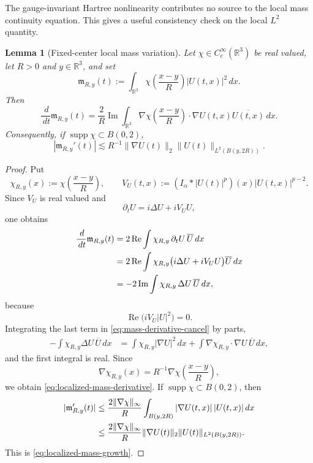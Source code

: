 \documentclass[preprint,12pt]{elsarticle}
\numberwithin{equation}{section}
\newtheorem{lemma}[theorem]{Lemma}
\theoremstyle{remark}
\newcommand{\R}{\mathbb R}
\newcommand{\dd}{\,d}
\begin{document}
The gauge-invariant Hartree nonlinearity contributes no source to the local mass continuity equation. This gives a useful consistency check on the local $L^2$ quantity.

\begin{lemma}[Fixed-center local mass variation]\label{lem:local-mass-variation}
Let $\chi\in C_c^\infty(\R^3)$ be real valued, let $R>0$ and $y\in\R^3$, and set
\begin{equation*}
  \mathfrak m_{R,y}(t)
  :=\int_{\R^3}\chi\left(\frac{x-y}{R}\right)|U(t,x)|^2\dd x.
\end{equation*}
Then
\begin{equation}\label{eq:localized-mass-derivative}
  \frac{\dd}{\dd t}\mathfrak m_{R,y}(t)
  =\frac2R\operatorname{Im}
  \int_{\R^3}
  \nabla\chi\left(\frac{x-y}{R}\right)
  \cdot\nabla U(t,x)\overline{U(t,x)}\dd x.
\end{equation}
Consequently, if $\operatorname{supp}\chi\subset B(0,2)$,
\begin{equation}\label{eq:localized-mass-growth}
  |\mathfrak m_{R,y}'(t)|
  \lesssim R^{-1}\|\nabla U(t)\|_2
  \|U(t)\|_{L^2(B(y,2R))}.
\end{equation}
\end{lemma}

\begin{proof}
Put
\[
  \chi_{R,y}(x):=\chi\left(\frac{x-y}{R}\right),
  \qquad
  V_U(t,x):=(I_\alpha*|U(t)|^p)(x)|U(t,x)|^{p-2}.
\]
Since $V_U$ is real valued and
\[
  \partial_tU=i\Delta U+iV_UU,
\]
one obtains
\begin{align}
  \frac{\dd}{\dd t}\mathfrak m_{R,y}(t)
  &=2\operatorname{Re}
  \int\chi_{R,y}\,\partial_tU\,\overline U\dd x\notag\\
  &=2\operatorname{Re}
  \int\chi_{R,y}
  \bigl(i\Delta U+iV_UU\bigr)\overline U\dd x\notag\\
  &=-2\operatorname{Im}
  \int\chi_{R,y}\,\Delta U\,\overline U\dd x,
  \label{eq:mass-derivative-cancel}
\end{align}
because
\[
  \operatorname{Re}\bigl(iV_U|U|^2\bigr)=0.
\]
Integrating the last term in \eqref{eq:mass-derivative-cancel} by parts,
\begin{align*}
  -\int\chi_{R,y}\Delta U\,\overline U\dd x
  &=\int\chi_{R,y}|\nabla U|^2\dd x
  +\int\nabla\chi_{R,y}\cdot\nabla U\,\overline U\dd x,
\end{align*}
and the first integral is real.  Since
\[
  \nabla\chi_{R,y}(x)
  =R^{-1}\nabla\chi\left(\frac{x-y}{R}\right),
\]
we obtain \eqref{eq:localized-mass-derivative}.  If $\operatorname{supp}\chi\subset B(0,2)$, then
\begin{align*}
  |\mathfrak m_{R,y}'(t)|
  &\le\frac{2\|\nabla\chi\|_\infty}{R}
  \int_{B(y,2R)}|\nabla U(t,x)|\,|U(t,x)|\dd x\notag\\
  &\le\frac{2\|\nabla\chi\|_\infty}{R}
  \|\nabla U(t)\|_2
  \|U(t)\|_{L^2(B(y,2R))}.
\end{align*}
This is \eqref{eq:localized-mass-growth}.
\end{proof}
\end{document}
